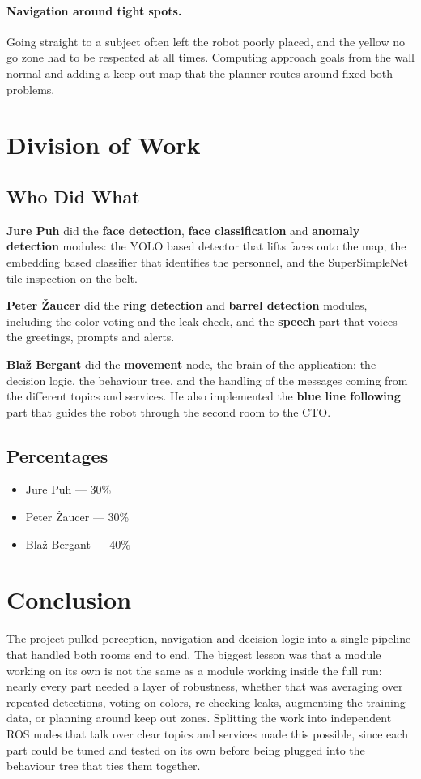 \documentclass[a4paper, 11pt]{article}
\begin{document}
\paragraph{Navigation around tight spots.}
Going straight to a subject often left the robot poorly placed, and the yellow no go zone
had to be respected at all times. Computing approach goals from the wall normal and adding
a keep out map that the planner routes around fixed both problems.

\section{Division of Work}

\subsection{Who Did What}

\textbf{Jure Puh} did the \textbf{face detection}, \textbf{face classification} and
\textbf{anomaly detection} modules: the YOLO based detector that lifts faces onto the map,
the embedding based classifier that identifies the personnel, and the SuperSimpleNet tile
inspection on the belt.

\textbf{Peter \v{Z}aucer} did the \textbf{ring detection} and \textbf{barrel detection}
modules, including the color voting and the leak check, and the \textbf{speech} part that
voices the greetings, prompts and alerts.

\textbf{Bla\v{z} Bergant} did the \textbf{movement} node, the brain of the application:
the decision logic, the behaviour tree, and the handling of the messages coming from the
different topics and services. He also implemented the \textbf{blue line following} part
that guides the robot through the second room to the CTO.

\subsection{Percentages}

\begin{itemize}
  \item Jure Puh --- 30\%
  \item Peter \v{Z}aucer --- 30\%
  \item Bla\v{z} Bergant --- 40\%
\end{itemize}

\section{Conclusion}

The project pulled perception, navigation and decision logic into a single pipeline that
handled both rooms end to end. The biggest lesson was that a module working on its own is
not the same as a module working inside the full run: nearly every part needed a layer of
robustness, whether that was averaging over repeated detections, voting on colors,
re-checking leaks, augmenting the training data, or planning around keep out zones.
Splitting the work into independent ROS nodes that talk over clear topics and services
made this possible, since each part could be tuned and tested on its own before being
plugged into the behaviour tree that ties them together.
\end{document}
